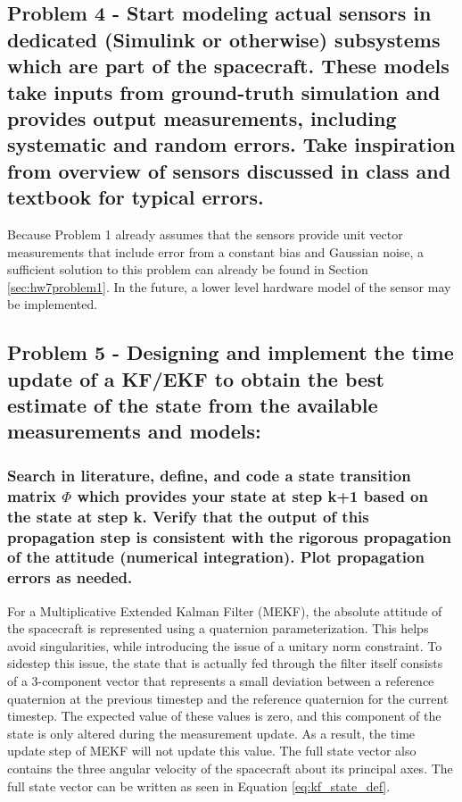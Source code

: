 \subsection{Problem 4 - Start modeling actual sensors in dedicated (Simulink or otherwise) subsystems which are part of the spacecraft. These models take inputs from ground-truth simulation and provides output measurements, including systematic and random errors. Take inspiration from overview of sensors discussed in class and
textbook for typical errors.}

Because Problem 1 already assumes that the sensors provide unit vector measurements that include error from a constant bias and Gaussian noise, a sufficient solution to this problem can already be found in Section \ref{sec:hw7problem1}. In the future, a lower level hardware model of the sensor may be implemented.

\subsection{Problem 5 - Designing and implement the time update of a KF/EKF to obtain the best estimate of the state from the available measurements and models:}

\subsubsection{Search in literature, define, and code a state transition matrix $\Phi$ which provides your state at step k+1 based on the state at step k. Verify that the output of this propagation step is consistent with the rigorous propagation of the attitude (numerical integration). Plot propagation errors as needed.}

For a Multiplicative Extended Kalman Filter (MEKF), the absolute attitude of the spacecraft is represented using a quaternion parameterization. This helps avoid singularities, while introducing the issue of a unitary norm constraint. To sidestep this issue, the state that is actually fed through the filter itself consists of a 3-component vector that represents a small deviation between a reference quaternion at the previous timestep and the reference quaternion for the current timestep. The expected value of these values is zero, and this component of the state is only altered during the measurement update. As a result, the time update step of MEKF will not update this value. The full state vector also contains the three angular velocity of the spacecraft about its principal axes. The full state vector can be written as seen in Equation \ref{eq:kf_state_def}.

